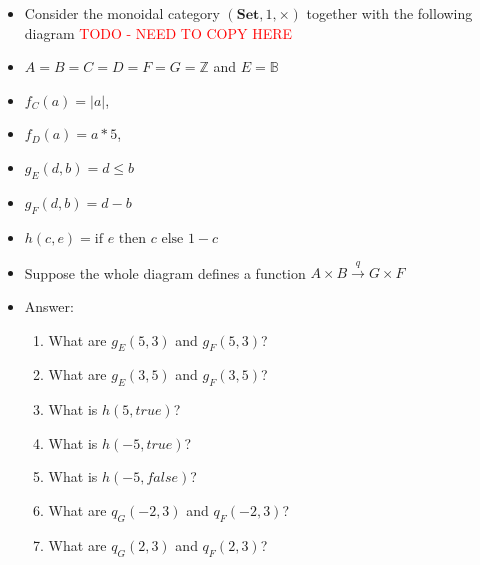 \begin{itemize}

    \item Consider the monoidal category $(\mathbf{Set},1,\times)$ together with the following diagram \textcolor{red}{TODO - NEED TO COPY HERE}
    \item $A=B=C=D=F=G=\mathbb{Z}$ and $E=\mathbb{B}$
    \item $f_C(a)=|a|$,
    \item $f_D(a)=a*5$,
    \item $g_E(d,b)=d\leq b$
    \item $g_F(d,b)=d-b$
    \item $h(c,e)=\text{if }e\text{ then }c\text{ else }1-c$
    \item Suppose the whole diagram defines a function $A \times B \xrightarrow{q} G \times F$
    \item Answer:
          \begin{enumerate}
            \item What are $g_E(5,3)$ and $g_F(5,3)$?
            \item What are $g_E(3,5)$ and $g_F(3,5)$?
            \item What is $h(5,true)$?
            \item What is $h(-5,true)$?
            \item What is $h(-5,false)$?
            \item What are $q_G(-2,3)$ and $q_F(-2,3)$?
            \item What are $q_G(2,3)$ and $q_F(2,3)$?
          \end{enumerate}
  \end{itemize}
